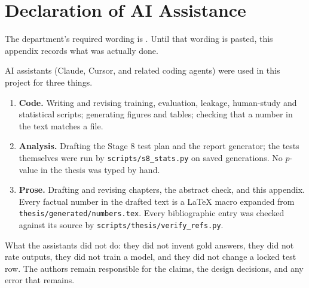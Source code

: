 \chapter{Declaration of AI Assistance}
\label{app:H}
\label{app:ai}

The department's required wording is . Until that wording is pasted, this appendix records what was actually done.

AI assistants (Claude, Cursor, and related coding agents) were used in this project for three things.

\begin{enumerate}[leftmargin=*]
  \item \textbf{Code.} Writing and revising training, evaluation, leakage, human-study and statistical scripts; generating figures and tables; checking that a number in the text matches a file.
  \item \textbf{Analysis.} Drafting the Stage 8 test plan and the report generator; the tests themselves were run by \texttt{scripts/s8\_stats.py} on saved generations. No $p$-value in the thesis was typed by hand.
  \item \textbf{Prose.} Drafting and revising chapters, the abstract check, and this appendix. Every factual number in the drafted text is a \LaTeX{} macro expanded from \texttt{thesis/generated/numbers.tex}. Every bibliographic entry was checked against its source by \texttt{scripts/thesis/verify\_refs.py}.
\end{enumerate}

What the assistants did not do: they did not invent gold answers, they did not rate outputs, they did not train a model, and they did not change a locked test row. The authors remain responsible for the claims, the design decisions, and any error that remains.
